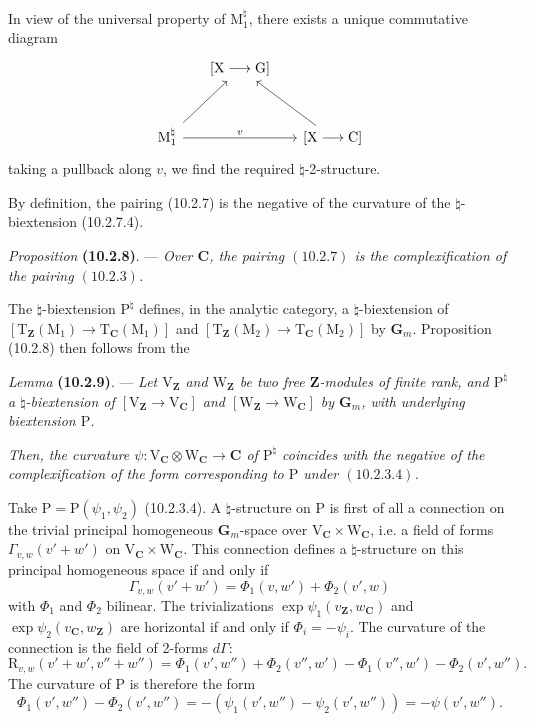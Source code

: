 \documentclass[11pt,leqno]{article}
\begin{document}
In view of the universal property of \(\mathrm{M}_1^{\natural}\),
there exists a unique commutative diagram
\[
\begin{tikzcd}[row sep=3em, column sep=1.5em]
& {[\mathrm{X}\longrightarrow\mathrm{G}]} &\\
\mathrm{M}_1^{\natural}
  \arrow[ur] \arrow[rr, "v"]
&& {[\mathrm{X}\longrightarrow\mathrm{C}]} \arrow[ul]
\end{tikzcd}
\]
taking a pullback along \(v\), we find the required
\(\natural\)-2-structure.

By definition, the pairing (10.2.7) is the negative of the
curvature of the \(\natural\)-biextension (10.2.7.4).

\textit{Proposition} \textbf{(10.2.8)}. — \textit{Over
\(\mathbf{C}\), the pairing \((10.2.7)\) is the complexification
of the pairing \((10.2.3)\).}

The \(\natural\)-biextension \(\mathrm{P}^{\natural}\) defines,
in the analytic category, a \(\natural\)-biextension of
\([\mathrm{T}_{\mathbf{Z}}(\mathrm{M}_1)\to
\mathrm{T}_{\mathbf{C}}(\mathrm{M}_1)]\) and
\([\mathrm{T}_{\mathbf{Z}}(\mathrm{M}_2)\to
\mathrm{T}_{\mathbf{C}}(\mathrm{M}_2)]\) by \(\mathbf{G}_m\).
Proposition (10.2.8) then follows from the

\textit{Lemma} \textbf{(10.2.9)}. — \textit{Let
\(\mathrm{V}_{\mathbf{Z}}\) and \(\mathrm{W}_{\mathbf{Z}}\)
be two free \(\mathbf{Z}\)-modules of finite rank, and \(\mathrm{P}^{\natural}\)
a \(\natural\)-biextension of
\([\mathrm{V}_{\mathbf{Z}}\to\mathrm{V}_{\mathbf{C}}]\) and
\([\mathrm{W}_{\mathbf{Z}}\to\mathrm{W}_{\mathbf{C}}]\) by
\(\mathbf{G}_m\), with underlying biextension \(\mathrm{P}\).}

\textit{Then, the curvature
\(\psi:\mathrm{V}_{\mathbf{C}}\otimes\mathrm{W}_{\mathbf{C}}
\to\mathbf{C}\) of \(\mathrm{P}^{\natural}\) coincides with
the negative of the complexification of the form corresponding to
\(\mathrm{P}\) under \((10.2.3.4)\).}

Take \(\mathrm{P}=\mathrm{P}(\psi_1,\psi_2)\) (10.2.3.4).
A \(\natural\)-structure on \(\mathrm{P}\) is first of all a
connection on the trivial principal homogeneous \(\mathbf{G}_m\)-space over
\(\mathrm{V}_{\mathbf{C}}\times\mathrm{W}_{\mathbf{C}}\),
i.e. a field of forms \(\Gamma_{v,w}(v'+w')\) on
\(\mathrm{V}_{\mathbf{C}}\times\mathrm{W}_{\mathbf{C}}\).
This connection defines a \(\natural\)-structure on this
principal homogeneous space if and only if
\[
\Gamma_{v,w}(v'+w')=\Phi_1(v,w')+\Phi_2(v',w)
\]
with \(\Phi_1\) and \(\Phi_2\) bilinear.
The trivializations \(\exp\psi_1(v_{\mathbf{Z}},w_{\mathbf{C}})\)
and \(\exp\psi_2(v_{\mathbf{C}},w_{\mathbf{Z}})\) are
horizontal if and only if \(\Phi_i=-\psi_i\).
The curvature of the connection is the field of 2-forms \(d\Gamma\):
\[
\mathrm{R}_{v,w}(v'+w',v''+w'')
=\Phi_1(v',w'')+\Phi_2(v'',w')
-\Phi_1(v'',w')-\Phi_2(v',w'').
\]
The curvature of \(\mathrm{P}\) is therefore the form
\[
\Phi_1(v',w'')-\Phi_2(v',w'')
=-(\psi_1(v',w'')-\psi_2(v',w''))
=-\psi(v',w'').
\]
\end{document}
